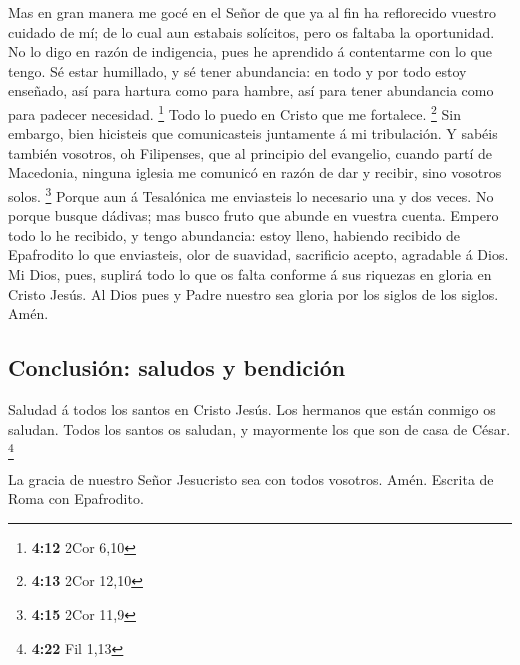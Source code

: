  Mas en gran manera me gocé en el Señor de que ya al fin
ha reflorecido vuestro cuidado de mí; de lo cual aun estabais solícitos,
pero os faltaba la oportunidad.  No lo digo en razón de
indigencia, pues he aprendido á contentarme con lo que tengo.
 Sé estar humillado, y sé tener abundancia: en todo y por
todo estoy enseñado, así para hartura como para hambre, así para tener
abundancia como para padecer necesidad. \footnote{\textbf{4:12} 2Cor
  6,10}  Todo lo puedo en Cristo que me fortalece.
\footnote{\textbf{4:13} 2Cor 12,10}  Sin embargo, bien
hicisteis que comunicasteis juntamente á mi tribulación. 
Y sabéis también vosotros, oh Filipenses, que al principio del
evangelio, cuando partí de Macedonia, ninguna iglesia me comunicó en
razón de dar y recibir, sino vosotros solos. \footnote{\textbf{4:15}
  2Cor 11,9}  Porque aun á Tesalónica me enviasteis lo
necesario una y dos veces.  No porque busque dádivas; mas
busco fruto que abunde en vuestra cuenta.  Empero todo lo
he recibido, y tengo abundancia: estoy lleno, habiendo recibido de
Epafrodito lo que enviasteis, olor de suavidad, sacrificio acepto,
agradable á Dios.  Mi Dios, pues, suplirá todo lo que os
falta conforme á sus riquezas en gloria en Cristo Jesús. 
Al Dios pues y Padre nuestro sea gloria por los siglos de los siglos.
Amén.

\hypertarget{conclusiuxf3n-saludos-y-bendiciuxf3n}{%
\subsection{Conclusión: saludos y
bendición}\label{conclusiuxf3n-saludos-y-bendiciuxf3n}}

 Saludad á todos los santos en Cristo Jesús. Los hermanos
que están conmigo os saludan.  Todos los santos os
saludan, y mayormente los que son de casa de César. \footnote{\textbf{4:22}
  Fil 1,13}

 La gracia de nuestro Señor Jesucristo sea con todos
vosotros. Amén. Escrita de Roma con Epafrodito.
